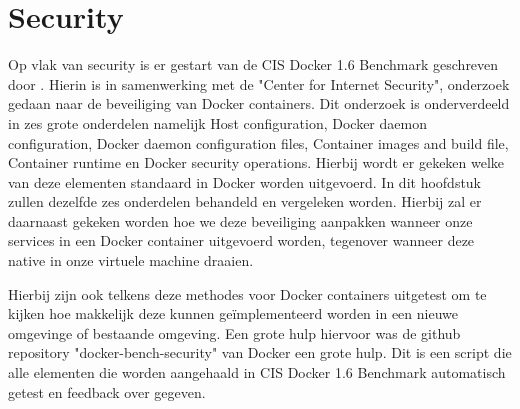 \chapter{Security}

Op vlak van security is er gestart van de CIS Docker 1.6 Benchmark geschreven door \cite{PravinGoyal2015}. Hierin is in samenwerking met de "Center for Internet Security", onderzoek gedaan naar de beveiliging van Docker containers. Dit onderzoek is onderverdeeld in zes grote onderdelen namelijk Host configuration, Docker daemon configuration, Docker daemon configuration files, Container images and build file, Container runtime en Docker security operations. Hierbij wordt er gekeken welke van deze elementen standaard in Docker worden uitgevoerd. In dit hoofdstuk zullen dezelfde zes onderdelen behandeld en vergeleken worden. Hierbij zal er daarnaast gekeken worden hoe we deze beveiliging aanpakken wanneer onze services in een Docker container uitgevoerd worden, tegenover wanneer deze native in onze virtuele machine draaien.


Hierbij zijn ook telkens deze methodes voor Docker containers uitgetest om te kijken hoe makkelijk deze kunnen geïmplementeerd worden in een nieuwe omgevinge of bestaande omgeving. Een grote hulp hiervoor was de github repository "docker-bench-security" van Docker een grote hulp. Dit is een script die alle elementen die worden aangehaald in CIS Docker 1.6 Benchmark automatisch getest en feedback over gegeven.





